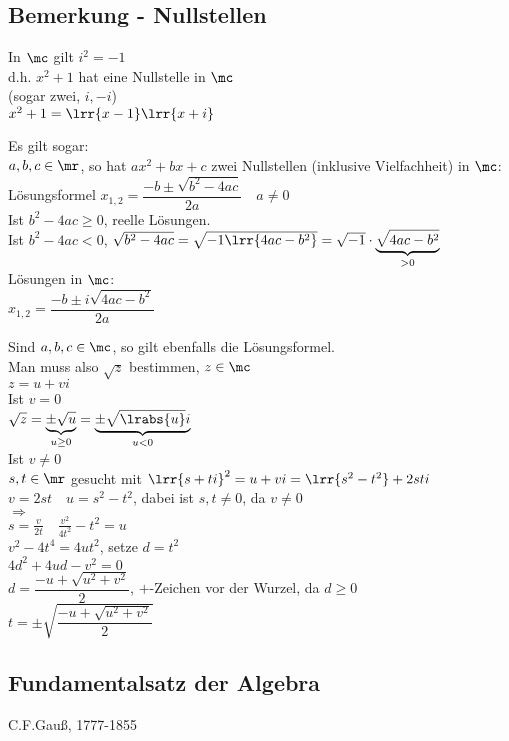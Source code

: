 \subsection{Bemerkung - Nullstellen}
		\item In $\mc$ gilt $i^2=-1$\\
			d.h. $x^2+1$ hat eine Nullstelle in $\mc$\\
			(sogar zwei, $i,-i$)\\
			$x^2+1=\lrr{x-1}\lrr{x+i}$

			Es gilt sogar:\\
			$a,b,c\in\mr$, so hat $ax^2+bx+c$ zwei Nullstellen (inklusive Vielfachheit) in $\mc$:\\
			Lösungsformel $x_{1,2}=\dfrac{-b\pm\sqrt{b^2-4ac}}{2a}\quad a\neq 0$\\
			Ist $b^2-4ac\geq 0$, reelle Lösungen.\\
			Ist $b^2-4ac <0$, $\sqrt{b^2-4ac}=\sqrt{-1\lrr{4ac-b^2}}=\sqrt{-1}\cdot \underbrace{\sqrt{4ac-b^2}}_{>0}$\\
			Lösungen in $\mc$:\\
			$x_{1,2} =\dfrac{-b\pm i\sqrt{4ac-b^2}}{2a}$
		\item Sind $a,b,c \in \mc$, so gilt ebenfalls die Lösungsformel.\\
			Man muss also $\sqrt{z}$ bestimmen, $z\in\mc$\\
			$z=u+vi$\\
			Ist $v=0$\\
			$\sqrt{z}=\underbrace{\pm\sqrt{u}}_{u\geq 0}=\underbrace{\pm\sqrt{\lrabs{u}}i}_{u<0}$\\
			Ist $v\neq 0$\\
			$s,t\in\mr$ gesucht mit $\lrr{s+ti}^2=u+vi=\lrr{s^2-t^2}+2sti$\\
			$v=2st\quad u=s^2-t^2$, dabei ist $s,t\neq 0$, da $v\neq 0$\\
			$\Rightarrow$\\
			$s=\frac{v}{2t}\quad\frac{v^2}{4t^2}-t^2=u$\\
			$v^2-4t^4=4ut^2$, setze $d=t^2$\\
			$4d^2+4ud-v^2=0$\\
			$d=\dfrac{-u+\sqrt{u^2+v^2}}{2}$, $+$-Zeichen vor der Wurzel, da $d\geq 0$\\
			$t=\pm\sqrt{\dfrac{-u+\sqrt{u^2+v^2}}{2}}$
	\subExEnd

\subsection{Fundamentalsatz der Algebra}
	C.F.Gauß, 1777-1855

